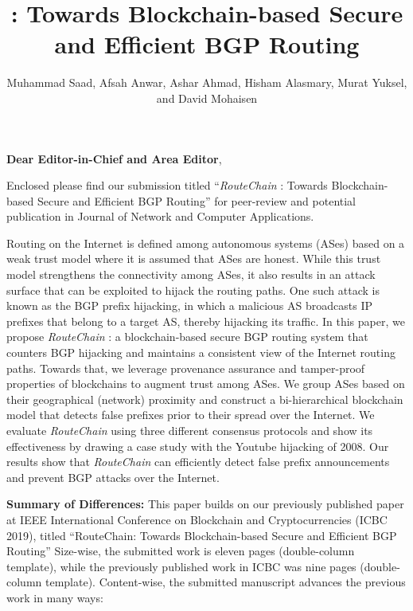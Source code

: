 \documentclass{abmart}
\title{\rc: Towards Blockchain-based Secure and Efficient BGP Routing}
\author{Muhammad Saad, Afsah Anwar, Ashar Ahmad, Hisham Alasmary, Murat Yuksel, and David Mohaisen}
\newcommand{\rc}{{{\em RouteChain }}}
\begin{document}
\maketitle

\textbf{Dear Editor-in-Chief and Area Editor}, 

Enclosed please find our submission titled ``\rc: Towards Blockchain-based Secure and Efficient BGP Routing'' for peer-review and potential publication in Journal of Network and Computer Applications.

Routing on the Internet is defined among autonomous systems (ASes) based on a weak trust model where it is assumed that ASes are honest. While this trust model strengthens the connectivity among ASes, it also results in an attack surface that can be exploited to hijack the routing paths. One such attack is known as the BGP prefix hijacking, in which a malicious AS broadcasts IP prefixes that belong to a target AS, thereby hijacking its traffic. In this paper, we propose \rc: a blockchain-based secure BGP routing system that counters BGP hijacking and maintains a consistent view of the Internet routing paths. Towards that, we leverage provenance assurance and tamper-proof properties of blockchains to augment trust among ASes. We group ASes based on their geographical (network) proximity and construct a bi-hierarchical blockchain model that detects false prefixes prior to their spread over the Internet. We evaluate \rc using three different consensus protocols and show its effectiveness by drawing a case study with the Youtube hijacking of 2008. Our results show that \rc can efficiently detect false prefix announcements and prevent BGP attacks over the Internet.  

\vspace{-2mm}
\noindent\textbf{Summary of Differences:} This paper builds on our previously published paper at IEEE  International Conference on Blockchain and Cryptocurrencies (ICBC 2019), titled ``RouteChain: Towards Blockchain-based Secure and Efficient BGP Routing'' Size-wise, the submitted work is eleven pages (double-column template), while the previously published work in ICBC was nine pages (double-column template). Content-wise, the submitted manuscript advances the previous work in many ways: 
\end{document}

